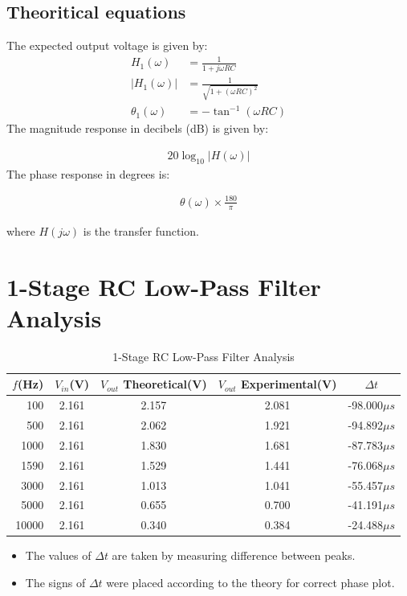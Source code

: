 \documentclass[12pt,a4paper]{report}
\begin{document}
\subsection{Theoritical equations}
The expected output voltage is given by:
\begin{align}
 H_1(\omega) &= \frac{1}{1 + j\omega R C} \\
 |H_1(\omega)| &= \frac{1}{\sqrt{1 + (\omega R C)^2}}\\
 \theta_1(\omega) &= -\tan^{-1}(\omega R C) 
\end{align}
The magnitude response in decibels (dB) is given by:

\begin{align}
20 \log_{10} |H(\omega)|
\end{align}
The phase response in degrees is:

\begin{align}
\theta(\omega) \times \frac{180}{\pi}
\end{align}

where \( H(j\omega) \) is the transfer function.
\newpage
\section*{1-Stage RC Low-Pass Filter Analysis}
\begin{table}[h]
    \centering
    \begin{tabular}{r c c c c}
        \toprule
        $f$(Hz) & $V_{in}$(V) & $V_{out}$ Theoretical(V) & $V_{out}$ Experimental(V) & $\Delta t$\\
        \midrule
        100  & 2.161 & 2.157 & 2.081 & -98.000$\mu s$\\
        500  & 2.161 & 2.062 & 1.921 & -94.892$\mu s$\\
        1000 & 2.161 & 1.830 & 1.681 & -87.783$\mu s$\\
        1590 & 2.161 & 1.529 & 1.441 & -76.068$\mu s$\\
        3000 & 2.161 & 1.013 & 1.041 & -55.457$\mu s$\\
        5000 & 2.161 & 0.655 & 0.700 & -41.191$\mu s$\\
        10000 & 2.161 & 0.340 & 0.384 & -24.488$\mu s$\\
        \bottomrule
    \end{tabular}
    \caption{1-Stage RC Low-Pass Filter Analysis}
\end{table}
\begin{itemize}
    \item The values of $\Delta t$ are taken by measuring difference between peaks.
    \item The signs of $\Delta t$ were placed according to the theory for correct phase plot.
\end{itemize}
\end{document}
